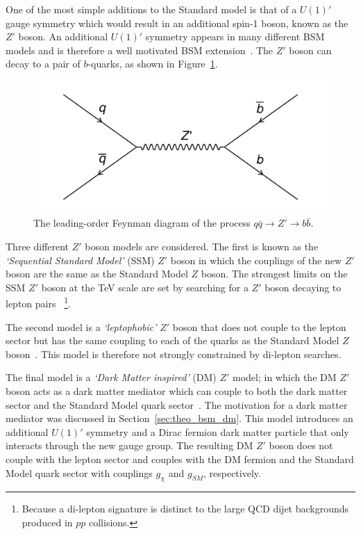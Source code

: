 One of the most simple additions to the Standard model is that of a $U(1)'$ gauge symmetry
which would result in an additional spin-1 boson, known as the $Z'$ boson.
An additional $U(1)'$ symmetry appears in many different BSM models and is therefore a well motivated BSM extension~\cite{theo-bsm_zprime}.
The $Z'$ boson can decay to a pair of $b$-quarks, as shown in Figure~\ref{fig:theo-bsm_zprime}.

\begin{figure}[!hbt]
  \begin{center}
    \includegraphics[width=0.7\linewidth, angle=0]{figs/Theory/bsm_zprime.png}
  \end{center}
  \caption{The leading-order Feynman diagram of the process $q\bar{q} \to Z' \to b\bar{b}$.}
  \label{fig:theo-bsm_zprime}
\end{figure}

Three different $Z'$ boson models are considered.
The first is known as the \textit{`Sequential Standard Model'} (SSM) $Z'$ boson in which the couplings
of the new $Z'$ boson are the same as the Standard Model $Z$ boson.
The strongest limits on the SSM $Z'$ boson at the TeV scale are set by searching for a $Z'$ boson decaying
to lepton pairs~\cite{theo-bsm_dilep} \footnote{Because a di-lepton signature is distinct to the large QCD dijet backgrounds produced in $pp$ collisions.}.

The second model is a \textit{`leptophobic'} $Z'$ boson that does not couple to the lepton sector
but has the same coupling to each of the quarks as the Standard Model $Z$ boson~\cite{theo-bsm_zprime_leptophobic}.
This model is therefore not strongly constrained by di-lepton searches.

The final model is a \textit{`Dark Matter inspired'} (DM) $Z'$ model;
in which the DM $Z'$ boson acts as a dark matter mediator which can couple to both the dark matter sector and the Standard Model quark sector~\cite{theo_bsm-zprime_dm}.
The motivation for a dark matter mediator was discussed in Section~\ref{sec:theo_bsm_dm}.
This model introduces an additional $U(1)'$ symmetry and a Dirac fermion dark matter particle that only interacts through the new gauge group.
The resulting DM $Z'$ boson does not couple with the lepton sector
and couples with the DM fermion and the Standard Model quark sector with couplings $g_\chi$\hspace{0.1mm} and $g_{SM}$\hspace{0.1mm}, respectively.

